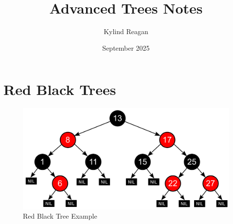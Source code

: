 \documentclass{article}
\title{Advanced Trees Notes}
\author{Kylind Reagan}
\date{September 2025}
\begin{document}
\maketitle

\section{Red Black Trees}
\begin{figure}[htp]
    \includegraphics[width=\textwidth]{RBT.png}
    \caption{Red Black Tree Example}
    \label{tab:placeholder}
\end{figure}
\end{document}
